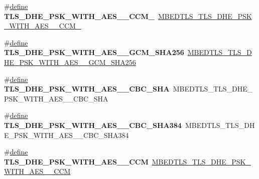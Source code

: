 \begin{DoxyCompactItemize}
\item 
\mbox{\label{compat-1_83_8h_a9af4047e8528535df0c2efe65aa9e56b}} 
\#\hyperlink{structdefine}{define} {\bfseries T\+L\+S\+\_\+\+D\+H\+E\+\_\+\+P\+S\+K\+\_\+\+W\+I\+T\+H\+\_\+\+A\+E\+S\+\_\+\_\+\+C\+C\+M\+\_}~\hyperlink{ssl__ciphersuites_8h_a31040116f8e3b15310b67722de2a2511}{M\+B\+E\+D\+T\+L\+S\+\_\+\+T\+L\+S\+\_\+\+D\+H\+E\+\_\+\+P\+S\+K\+\_\+\+W\+I\+T\+H\+\_\+\+A\+E\+S\+\_\+\_\+\+C\+C\+M\+\_}
\item 
\mbox{\label{compat-1_83_8h_ab95dab0a3d2433b066d2027fa16aa5ac}} 
\#\hyperlink{structdefine}{define} {\bfseries T\+L\+S\+\_\+\+D\+H\+E\+\_\+\+P\+S\+K\+\_\+\+W\+I\+T\+H\+\_\+\+A\+E\+S\+\_\+\_\+\+G\+C\+M\+\_\+\+S\+H\+A256}~\hyperlink{ssl__ciphersuites_8h_ad9152bd1c1975fc6bebd8262977e7435}{M\+B\+E\+D\+T\+L\+S\+\_\+\+T\+L\+S\+\_\+\+D\+H\+E\+\_\+\+P\+S\+K\+\_\+\+W\+I\+T\+H\+\_\+\+A\+E\+S\+\_\+\_\+\+G\+C\+M\+\_\+\+S\+H\+A256}
\item 
\mbox{\label{compat-1_83_8h_ac8af95f28962ba51d15872e90a6748a5}} 
\#\hyperlink{structdefine}{define} {\bfseries T\+L\+S\+\_\+\+D\+H\+E\+\_\+\+P\+S\+K\+\_\+\+W\+I\+T\+H\+\_\+\+A\+E\+S\+\_\+\_\+\+C\+B\+C\+\_\+\+S\+HA}~M\+B\+E\+D\+T\+L\+S\+\_\+\+T\+L\+S\+\_\+\+D\+H\+E\+\_\+\+P\+S\+K\+\_\+\+W\+I\+T\+H\+\_\+\+A\+E\+S\+\_\+\_\+\+C\+B\+C\+\_\+\+S\+HA
\item 
\mbox{\label{compat-1_83_8h_a600d77e61a14ab21d494118a604c9aaa}} 
\#\hyperlink{structdefine}{define} {\bfseries T\+L\+S\+\_\+\+D\+H\+E\+\_\+\+P\+S\+K\+\_\+\+W\+I\+T\+H\+\_\+\+A\+E\+S\+\_\+\_\+\+C\+B\+C\+\_\+\+S\+H\+A384}~M\+B\+E\+D\+T\+L\+S\+\_\+\+T\+L\+S\+\_\+\+D\+H\+E\+\_\+\+P\+S\+K\+\_\+\+W\+I\+T\+H\+\_\+\+A\+E\+S\+\_\+\_\+\+C\+B\+C\+\_\+\+S\+H\+A384
\item 
\mbox{\label{compat-1_83_8h_a16bfd8ab90a52b8fd1ee88e6f088d0c1}} 
\#\hyperlink{structdefine}{define} {\bfseries T\+L\+S\+\_\+\+D\+H\+E\+\_\+\+P\+S\+K\+\_\+\+W\+I\+T\+H\+\_\+\+A\+E\+S\+\_\+\_\+\+C\+CM}~\hyperlink{ssl__ciphersuites_8h_a2141b7b6cde8ab8e3e2cc36e08532383}{M\+B\+E\+D\+T\+L\+S\+\_\+\+T\+L\+S\+\_\+\+D\+H\+E\+\_\+\+P\+S\+K\+\_\+\+W\+I\+T\+H\+\_\+\+A\+E\+S\+\_\+\_\+\+C\+CM}
\item 
\mbox{\label{compat-1_83_8h_a883070fea785e3127a307018841bdc47}} 

\end{DoxyCompactItemize}
